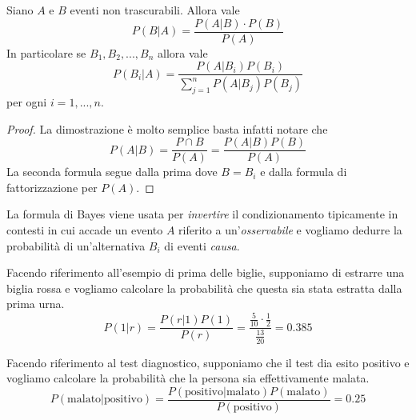 \begin{theorem}[Bayes]\label{th: bayes}
	Siano $A$ e $B$ eventi non trascurabili. Allora vale
	\[ P(B | A) = \frac{P(A | B) \cdot P(B)}{P(A)} \]
	In particolare se $B_1, B_2, ..., B_n$ allora vale
	\[ P(B_i | A) = \frac{P(A | B_i) P(B_i)}{\sum_{j=1}^n P(A | B_j) P(B_j)} \]
	per ogni $i = 1, ..., n$.
	\begin{proof}
		La dimostrazione è molto semplice basta infatti notare che
		\[ P(A | B) = \frac{P \cap B}{P(A)} = \frac{P(A | B) P(B)}{P(A)} \]
		La seconda formula segue dalla prima dove $B=B_i$ e dalla formula di fattorizzazione
		per $P(A)$.
	\end{proof}
\end{theorem}

La formula di Bayes viene usata per \emph{invertire} il condizionamento tipicamente in contesti
in cui accade un evento $A$ riferito a un'\emph{osservabile} e vogliamo dedurre la probabilità di
un'alternativa $B_i$ di eventi \emph{causa}.

\begin{example}
	Facendo riferimento all'esempio di prima delle biglie, supponiamo di estrarre una biglia
	rossa e vogliamo calcolare la probabilità che questa sia stata estratta dalla prima urna.
	\[
		P(1 | r) = \frac{P(r | 1) P(1)}{P(r)} =
		\frac{\frac{5}{10} \cdot \frac{1}{2}}{\frac{13}{20}} = 0.385
	\]
\end{example}

\begin{example}
	Facendo riferimento al test diagnostico, supponiamo che il test dia esito positivo e vogliamo
	calcolare la probabilità che la persona sia effettivamente malata.
	\[
		P(\text{malato} | \text{positivo}) =
		\frac{P(\text{positivo} | \text{malato}) P(\text{malato})}{P(\text{positivo})} = 0.25
	\]
\end{example}
